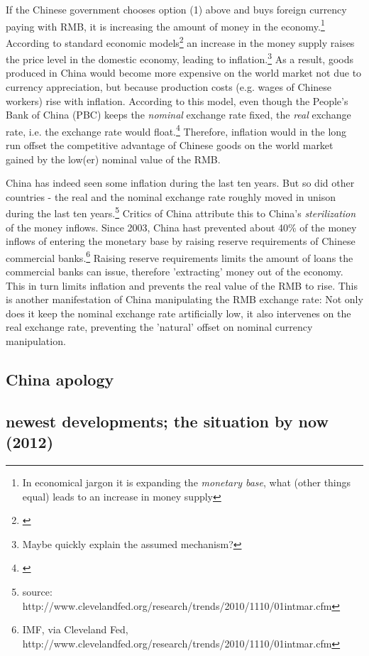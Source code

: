 \documentclass[11pt]{article}
\begin{document}
If the Chinese government chooses option (1) above and buys foreign currency paying with RMB, it is increasing the amount of money in the economy.\footnote{In economical jargon it is expanding the \emph{monetary base}, what (other things equal) leads to an increase in money supply} According to standard economic models\footnote{\cite[pp. ?]{Krugman2008}} an increase in the money supply raises the price level in the domestic economy, leading to inflation.\footnote{Maybe quickly explain the assumed mechanism?} As a result, goods produced in China would become more expensive on the world market not due to currency appreciation, but because production costs (e.g. wages of Chinese workers) rise with inflation. According to this model, even though the People's Bank of China (PBC) keeps the \emph{nominal} exchange rate fixed, the \emph{real} exchange rate, i.e. the exchange rate would float.\footnote{\cite[p. 509]{Krugman}} Therefore, inflation would in the long run offset the competitive advantage of Chinese goods on the world market gained by the low(er) nominal value of the RMB.

China has indeed seen some inflation during the last ten years. But so did other countries - the real and the nominal exchange rate roughly moved in unison during the last ten years.\footnote{source: http://www.clevelandfed.org/research/trends/2010/1110/01intmar.cfm}%
Critics of China attribute this to China's \emph{sterilization} of the money inflows. Since 2003, China hast prevented about 40\% of the money inflows of entering the monetary base by raising reserve requirements of Chinese commercial banks.\footnote{IMF, via Cleveland Fed, http://www.clevelandfed.org/research/trends/2010/1110/01intmar.cfm}%
Raising reserve requirements limits the amount of loans the commercial banks can issue, therefore 'extracting' money out of the economy. This in turn limits inflation and prevents the real value of the RMB to rise. This is another manifestation of China manipulating the RMB exchange rate: Not only does it keep the nominal exchange rate artificially low, it also intervenes on the real exchange rate, preventing the 'natural' offset on nominal currency manipulation.



\subsection{China apology}


\subsection{newest developments; the situation by now (2012)}
\end{document}

